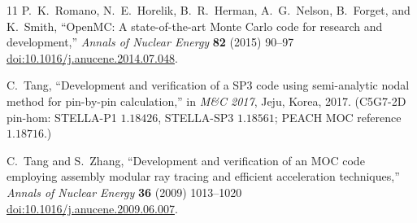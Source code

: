\documentclass[11pt,a4paper]{article}
\newcommand{\doi}[1]{\,\href{https://doi.org/#1}{doi:#1}}
\begin{document}
\begin{thebibliography}{11}
P.~K.~Romano, N.~E.~Horelik, B.~R.~Herman, A.~G.~Nelson, B.~Forget, and
K.~Smith, ``OpenMC: A state-of-the-art Monte Carlo code for research
and development,'' \emph{Annals of Nuclear Energy} \textbf{82} (2015)
90--97 \doi{10.1016/j.anucene.2014.07.048}.

C.~Tang, ``Development and verification of a SP3 code using
semi-analytic nodal method for pin-by-pin calculation,'' in
\emph{M\&C 2017}, Jeju, Korea, 2017. (C5G7-2D pin-hom: STELLA-P1
$1.18426$, STELLA-SP3 $1.18561$; PEACH MOC reference $1.18716$.)

C.~Tang and S.~Zhang, ``Development and verification of an MOC code
employing assembly modular ray tracing and efficient acceleration
techniques,'' \emph{Annals of Nuclear Energy} \textbf{36} (2009)
1013--1020 \doi{10.1016/j.anucene.2009.06.007}.

\end{thebibliography}


\end{document}

